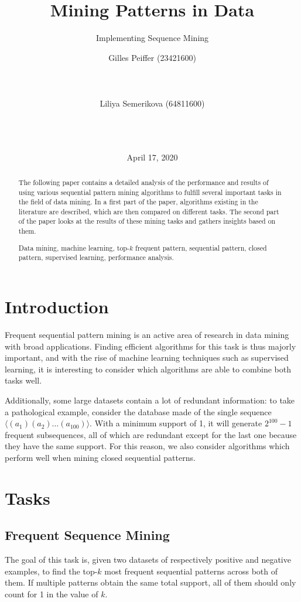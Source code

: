 \documentclass{sigkddExp}
\title{Mining Patterns in Data}
\subtitle{Implementing Sequence Mining}
\author{
\alignauthor Gilles Peiffer (23421600)\\
	\affaddr{Université catholique de Louvain}\\
	\affaddr{Place de l'Université 1}\\
	\affaddr{Louvain-la-Neuve, Belgium}\\
	\email{gilles.peiffer@student.uclouvain.be}
\alignauthor Liliya Semerikova (64811600)\\
	\affaddr{Université catholique de Louvain}\\
	\affaddr{Place de l'Université 1}\\
	\affaddr{Louvain-la-Neuve, Belgium}\\
	\email{liliya.semerikova@student.uclouvain.be}}
\date{April 17, 2020}
\begin{document}
\maketitle

\begin{abstract}
	The following paper contains a detailed analysis of the performance and results of using various sequential pattern mining algorithms to fulfill several important tasks in the field of data mining.
	In a first part of the paper, algorithms existing in the literature are described, which are then compared on different tasks.
	The second part of the paper looks at the results of these mining tasks and gathers insights based on them.
	
	\keywords Data mining, machine learning, top-\(k\) frequent pattern, sequential pattern, closed pattern, supervised learning, performance analysis.
\end{abstract}

\section{Introduction}
Frequent sequential pattern mining is an active area of research in data mining with broad applications.
Finding efficient algorithms for this task is thus majorly important, and with the rise of machine learning techniques such as supervised learning, it is interesting to consider which algorithms are able to combine both tasks well.

Additionally, some large datasets contain a lot of redundant information: to take a pathological example, consider the database made of the single sequence \(\langle (a_1)(a_2) \dots (a_{100}) \rangle\).
With a minimum support of 1, it will generate \(2^{100} - 1\) frequent subsequences, all of which are redundant except for the last one because they have the same support.
For this reason, we also consider algorithms which perform well when mining closed sequential patterns.

\section{Tasks}
\label{sec:tasks}
\subsection{Frequent Sequence Mining}
\label{sec:fsm}
The goal of this task is, given two datasets of respectively positive and negative examples, to find the top-\(k\) most frequent sequential patterns across both of them.
If multiple patterns obtain the same total support, all of them should only count for 1 in the value of \(k\).
\end{document}
